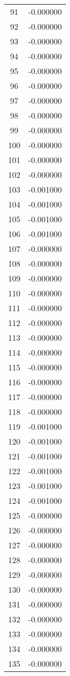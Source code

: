 \documentclass[12pt]{article}
\begin{document}
\begin{longtable}{@{}cc@{}}
91 & -0.000000 \\
92 & -0.000000 \\
93 & -0.000000 \\
94 & -0.000000 \\
95 & -0.000000 \\
96 & -0.000000 \\
97 & -0.000000 \\
98 & -0.000000 \\
99 & -0.000000 \\
100 & -0.000000 \\
101 & -0.000000 \\
102 & -0.000000 \\
103 & -0.001000 \\
104 & -0.001000 \\
105 & -0.001000 \\
106 & -0.001000 \\
107 & -0.000000 \\
108 & -0.000000 \\
109 & -0.000000 \\
110 & -0.000000 \\
111 & -0.000000 \\
112 & -0.000000 \\
113 & -0.000000 \\
114 & -0.000000 \\
115 & -0.000000 \\
116 & -0.000000 \\
117 & -0.000000 \\
118 & -0.000000 \\
119 & -0.001000 \\
120 & -0.001000 \\
121 & -0.001000 \\
122 & -0.001000 \\
123 & -0.001000 \\
124 & -0.001000 \\
125 & -0.000000 \\
126 & -0.000000 \\
127 & -0.000000 \\
128 & -0.000000 \\
129 & -0.000000 \\
130 & -0.000000 \\
131 & -0.000000 \\
132 & -0.000000 \\
133 & -0.000000 \\
134 & -0.000000 \\
135 & -0.000000 \\

\end{longtable}
\end{document}
